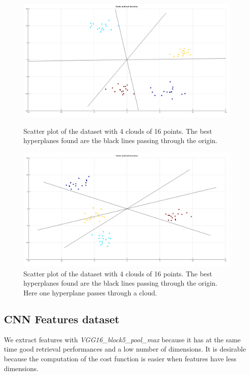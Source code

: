 \begin{figure}
	\centering
	
	\includegraphics[width=\textwidth]{img/hyper_2d_three_hyperplane_scatter_easy.png}
	\caption{Scatter plot of the dataset with 4 clouds of 16 points. The best hyperplanes found are the black lines passing through the origin.}
	\label{fig:hyper_2d_three_hyperplane_scatter_easy}
	
	\includegraphics[width=\textwidth]{img/hyper_2d_three_hyperplane_scatter_hard.png}
	\caption{Scatter plot of the dataset with 4 clouds of 16 points. The best hyperplanes found are the black lines passing through the origin. Here one hyperplane passes through a cloud.}
	\label{fig:hyper_2d_three_hyperplane_scatter_hard}
\end{figure}

\subsection{CNN Features dataset}
We extract features with \textit{VGG16\_block5\_pool\_max} because it has at the same time good retrieval performances and a low number of dimensions. It is desirable because the computation of the cost function is easier when features have less dimensions. 

